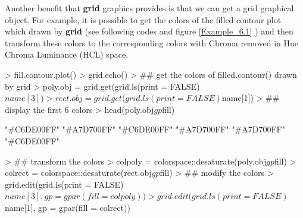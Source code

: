 \documentclass[11pt,twoside]{report}
\begin{document}
\newpage
Another benefit that \textbf{grid} graphics provides is that we can get a grid graphical object. For example, it is possible to get the colors of the filled contour plot which drawn by \textbf{grid} (see following codes and figure \ref{Example_6.1} ) and then transform these colors to the corresponding colors with Chroma removed in Hue Chroma Luminance (HCL) space.
\begin{Schunk}
\begin{Sinput}
> fill.contour.plot()
> grid.echo()
> ## get the colors of filled.contour() drawn by grid
> poly.obj = grid.get(grid.ls(print = FALSE)$name[3])
> rect.obj = grid.get(grid.ls(print = FALSE)$name[1])
> ## display the first 6 colors
> head(poly.obj$gp$fill)
\end{Sinput}
\begin{Soutput}
[1] "#C6DE00FF" "#A7D700FF" "#C6DE00FF" "#A7D700FF" "#A7D700FF" "#C6DE00FF"
\end{Soutput}
\begin{Sinput}
> ## transform the colors
> colpoly = colorspace::desaturate(poly.obj$gp$fill)
> colrect = colorspace::desaturate(rect.obj$gp$fill)
> ## modify the colors
> grid.edit(grid.ls(print = FALSE)$name[3], gp = gpar(fill = colpoly))
> grid.edit(grid.ls(print = FALSE)$name[1], gp = gpar(fill = colrect))
\end{Sinput}
\end{Schunk}
\end{document}
